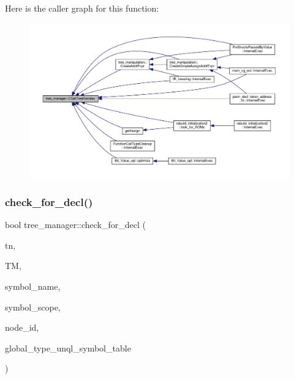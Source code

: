 Here is the caller graph for this function\+:
\nopagebreak
\begin{figure}[H]
\begin{center}
\leavevmode
\includegraphics[width=350pt]{d2/ddd/classtree__manager_a845dc23e54477b4c7dac3c874619ff60_icgraph}
\end{center}
\end{figure}
\mbox{\label{classtree__manager_a49d8c695d4e28fd1276bb00b068a000a}} 
\subsubsection{\texorpdfstring{check\+\_\+for\+\_\+decl()}{check\_for\_decl()}}
{\footnotesize\ttfamily bool tree\+\_\+manager\+::check\+\_\+for\+\_\+decl (\begin{DoxyParamCaption}\item[{const \hyperlink{tree__node_8hpp_a6ee377554d1c4871ad66a337eaa67fd5}{tree\+\_\+node\+Ref} \&}]{tn,  }\item[{const \hyperlink{tree__manager_8hpp_a96ff150c071ce11a9a7a1e40590f205e}{tree\+\_\+manager\+Ref} \&}]{TM,  }\item[{std\+::string \&}]{symbol\+\_\+name,  }\item[{std\+::string \&}]{symbol\+\_\+scope,  }\item[{unsigned int}]{node\+\_\+id,  }\item[{const \hyperlink{custom__map_8hpp_ad1ed68f2ff093683ab1a33522b144adc}{Custom\+Unordered\+Map}$<$ unsigned int, std\+::string $>$ \&}]{global\+\_\+type\+\_\+unql\+\_\+symbol\+\_\+table }\end{DoxyParamCaption})\hspace{0.3cm}{\ttfamily [private]}}



